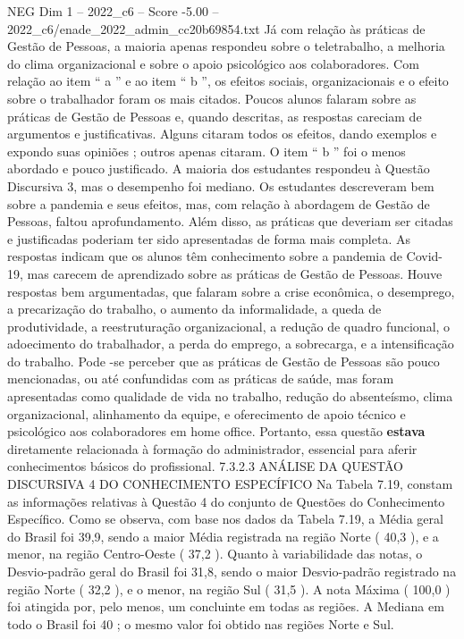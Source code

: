 \begin{textsample}{NEG Dim 1 – 2022\_c6 – Score -5.00 – 2022\_c6/enade\_2022\_admin\_cc20b69854.txt}
Já com relação às práticas de Gestão de Pessoas, a maioria apenas respondeu sobre o teletrabalho, a melhoria do clima organizacional e sobre o apoio psicológico aos colaboradores.
Com relação ao item “ a ” e ao item “ b ”, os efeitos sociais, organizacionais e o efeito sobre o trabalhador foram os mais citados.
Poucos alunos falaram sobre as práticas de Gestão de Pessoas e, quando descritas, as respostas careciam de argumentos e justificativas.
Alguns citaram todos os efeitos, dando exemplos e expondo suas opiniões ; outros apenas citaram.
O item “ b ” foi o menos abordado e pouco justificado.
A maioria dos estudantes respondeu à Questão Discursiva 3, mas o desempenho foi mediano.
Os estudantes descreveram bem sobre a pandemia e seus efeitos, mas, com relação à abordagem de Gestão de Pessoas, faltou aprofundamento.
Além disso, as práticas que deveriam ser citadas e justificadas poderiam ter sido apresentadas de forma mais completa.
As respostas indicam que os alunos têm conhecimento sobre a pandemia de Covid-19, mas carecem de aprendizado sobre as práticas de Gestão de Pessoas.
Houve respostas bem argumentadas, que falaram sobre a crise econômica, o desemprego, a precarização do trabalho, o aumento da informalidade, a queda de produtividade, a reestruturação organizacional, a redução de quadro funcional, o adoecimento do trabalhador, a perda do emprego, a sobrecarga, e a intensificação do trabalho.
Pode -se perceber que as práticas de Gestão de Pessoas são pouco mencionadas, ou até confundidas com as práticas de saúde, mas foram apresentadas como qualidade de vida no trabalho, redução do absenteísmo, clima organizacional, alinhamento da equipe, e oferecimento de apoio técnico e psicológico aos colaboradores em home office.
Portanto, essa questão \textbf{estava} diretamente relacionada à formação do administrador, essencial para aferir conhecimentos básicos do profissional. 7.3.2.3 ANÁLISE DA QUESTÃO DISCURSIVA 4 DO CONHECIMENTO ESPECÍFICO Na Tabela 7.19, constam as informações relativas à Questão 4 do conjunto de Questões do Conhecimento Específico.
Como se observa, com base nos dados da Tabela 7.19, a Média geral do Brasil foi 39,9, sendo a maior Média registrada na região Norte ( 40,3 ), e a menor, na região Centro-Oeste ( 37,2 ).
Quanto à variabilidade das notas, o Desvio-padrão geral do Brasil foi 31,8, sendo o maior Desvio-padrão registrado na região Norte ( 32,2 ), e o menor, na região Sul ( 31,5 ).
A nota Máxima ( 100,0 ) foi atingida por, pelo menos, um concluinte em todas as regiões.
A Mediana em todo o Brasil foi 40 ; o mesmo valor foi obtido nas regiões Norte e Sul.

\end{textsample}
